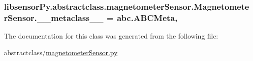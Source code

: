 \subsubsection[{\+\_\+\+\_\+metaclass\+\_\+\+\_\+}]{\setlength{\rightskip}{0pt plus 5cm}libsensor\+Py.\+abstractclass.\+magnetometer\+Sensor.\+Magnetometer\+Sensor.\+\_\+\+\_\+metaclass\+\_\+\+\_\+ = abc.\+A\+B\+C\+Meta\hspace{0.3cm}{\ttfamily [static]}, {\ttfamily [private]}}\label{classlibsensorPy_1_1abstractclass_1_1magnetometerSensor_1_1MagnetometerSensor_a93e4df31915a20934e45a1d05836c98b}


The documentation for this class was generated from the following file\+:\begin{DoxyCompactItemize}
\item 
abstractclass/\hyperlink{abstractclass_2magnetometerSensor_8py}{magnetometer\+Sensor.\+py}\end{DoxyCompactItemize}
